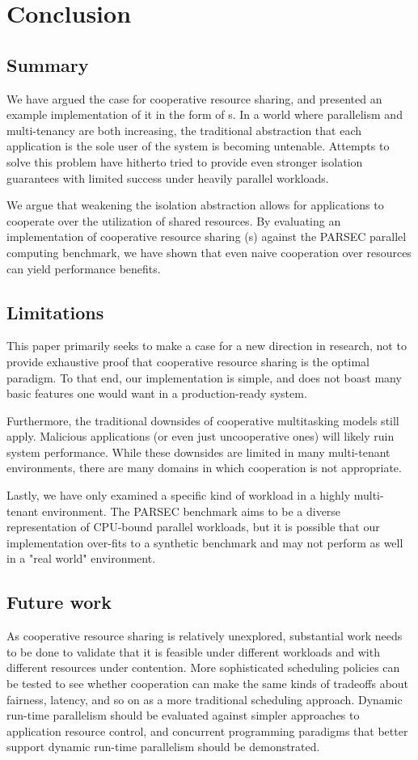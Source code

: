\section{Conclusion}
\subsection{Summary}
We have argued the case for cooperative resource sharing, and presented an example implementation of it in the form of \mechfull{}s. In a world where parallelism and multi-tenancy are both increasing, the traditional abstraction that each application is the sole user of the system is becoming untenable. Attempts to solve this problem have hitherto tried to provide even stronger isolation guarantees with limited success under heavily parallel workloads.

We argue that weakening the isolation abstraction allows for applications to cooperate over the utilization of shared resources. By evaluating an implementation of cooperative resource sharing (\mech{}s) against the PARSEC parallel computing benchmark, we have shown that even naive cooperation over resources can yield performance benefits.

\subsection{Limitations}
This paper primarily seeks to make a case for a new direction in research, not to provide exhaustive proof that cooperative resource sharing is the optimal paradigm. To that end, our implementation is simple, and does not boast many basic features one would want in a production-ready system. 

Furthermore, the traditional downsides of cooperative multitasking models still apply. Malicious applications (or even just uncooperative ones) will likely ruin system performance. While these downsides are limited in many multi-tenant environments, there are many domains in which cooperation is not appropriate.

Lastly, we have only examined a specific kind of workload in a highly multi-tenant environment. The PARSEC benchmark aims to be a diverse representation of CPU-bound parallel workloads, but it is possible that our implementation over-fits to a synthetic benchmark and may not perform as well in a "real world" environment.

\subsection{Future work}
As cooperative resource sharing is relatively unexplored, substantial work needs to be done to validate that it is feasible under different workloads and with different resources under contention. More sophisticated scheduling policies can be tested to see whether cooperation can make the same kinds of tradeoffs about fairness, latency, and so on as a more traditional scheduling approach. Dynamic run-time parallelism should be evaluated against simpler approaches to application resource control, and concurrent programming paradigms that better support dynamic run-time parallelism should be demonstrated.